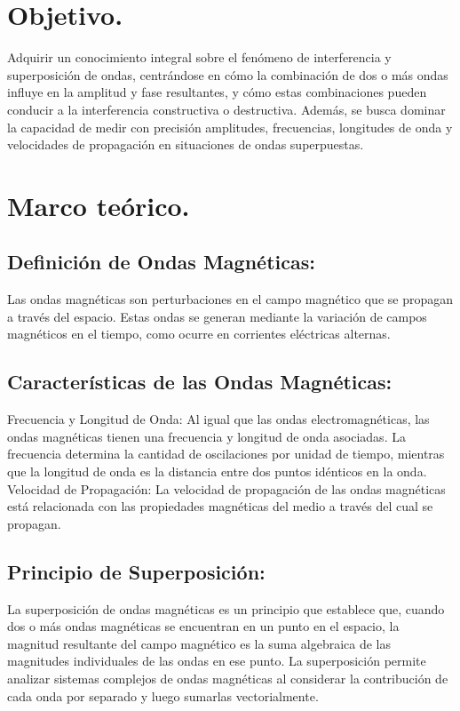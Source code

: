 \documentclass[10pt]{article}
\begin{document}
\begin{multicols}{2}

\section{Objetivo.}

Adquirir un conocimiento integral sobre el fenómeno de interferencia y superposición de ondas, centrándose en cómo la combinación de dos o más ondas influye en la amplitud y fase resultantes, y cómo estas combinaciones pueden conducir a la interferencia constructiva o destructiva. Además, se busca dominar la capacidad de medir con precisión amplitudes, frecuencias, longitudes de onda y velocidades de propagación en situaciones de ondas superpuestas.



\section{Marco teórico.}
\subsection{ Definición de Ondas Magnéticas:} 
Las ondas magnéticas son perturbaciones en el campo magnético que se propagan a través del espacio. Estas ondas se generan mediante la variación de campos magnéticos en el tiempo, como ocurre en corrientes eléctricas alternas.
\subsection{Características de las Ondas Magnéticas:}
Frecuencia y Longitud de Onda: Al igual que las ondas electromagnéticas, las ondas magnéticas tienen una frecuencia y longitud de onda asociadas. La frecuencia determina la cantidad de oscilaciones por unidad de tiempo, mientras que la longitud de onda es la distancia entre dos puntos idénticos en la onda.
Velocidad de Propagación: La velocidad de propagación de las ondas magnéticas está relacionada con las propiedades magnéticas del medio a través del cual se propagan.
\subsection{Principio de Superposición:}
 La superposición de ondas magnéticas es un principio que establece que, cuando dos o más ondas magnéticas se encuentran en un punto en el espacio, la magnitud resultante del campo magnético es la suma algebraica de las magnitudes individuales de las ondas en ese punto. La superposición permite analizar sistemas complejos de ondas magnéticas al considerar la contribución de cada onda por separado y luego sumarlas vectorialmente.

\end{multicols}
\end{document}

